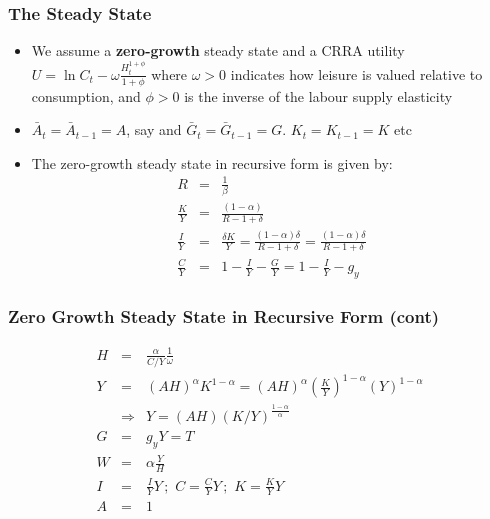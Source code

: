 \documentclass[xcolor=dvipsnames,handout,aspectratio=169]{beamer}
\begin{document}
\begin{frame}
 \frametitle{\textbf{The Steady State}}
 \begin{itemize}
\item We assume a  \textbf{zero-growth} steady state and a CRRA utility $U = \ln C_t - \omega\frac{H_t^{1+\phi}}{1+\phi}$
where $\omega> 0$ indicates how leisure is valued relative to consumption,
and $\phi> 0$ is the inverse of the labour supply elasticity
\item  $\bar{A}_t=\bar{A}_{t-1}=A$, say and $\bar{G}_t=\bar{G}_{t-1}=G$. $K_t=K_{t-1}=K$  etc
\item  The zero-growth  steady state in recursive form is given by:
\begin{eqnarray*}
R&=&\frac{1}{\beta}\\
\label{KY} \frac{K}{Y}&=&\frac{ (1-\alpha)}{R-1+\delta}  \\
\label{IY}
\frac{I}{Y}&=& \frac{\delta K}{Y}=\frac{ (1-\alpha)\delta}{R-1+\delta} =\frac{ (1-\alpha)\delta}{R-1+\delta}\\
\label{CY}  \frac{C}{Y}&=& 1-\frac{I}{Y}-\frac{G}{Y}=1-\frac{I}{Y}-g_y
\end{eqnarray*}
 \end{itemize}
\end{frame}

 \begin{frame}
  \frametitle{\textbf{Zero Growth Steady State in Recursive Form (cont) }}
 \begin{eqnarray*}
     H &=& \frac{\alpha}{C/Y}\frac{1}{\omega}\\
        Y&=&   (A H)^{\alpha} K^{1-\alpha}= (A H)^{ \alpha} \left(\frac{K}{Y}\right)^{1-\alpha} (Y)^{1-\alpha} \\  &\Rightarrow& Y= (A H) (K/Y)^\frac{{1-\alpha}}{\alpha}\\
               G&=&g_y Y=T \\
   W&=& \alpha  \frac{Y}{H} \\
   I&=& \frac{I}{Y} Y\, ;\,\, C= \frac{C}{Y} Y\,;\,\,  K= \frac{K}{Y} Y \\
   A&=& 1
\end{eqnarray*}
\end{frame}
\end{document}
